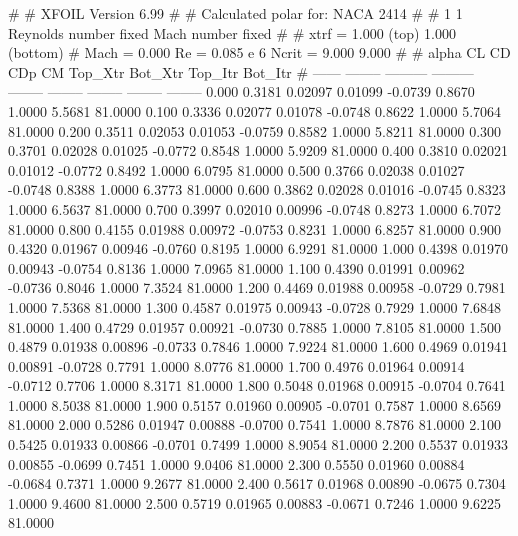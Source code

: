 #  
#       XFOIL         Version 6.99
#  
# Calculated polar for: NACA 2414                                       
#  
# 1 1 Reynolds number fixed          Mach number fixed         
#  
# xtrf =   1.000 (top)        1.000 (bottom)  
# Mach =   0.000     Re =     0.085 e 6     Ncrit =   9.000  9.000
#  
#   alpha    CL        CD       CDp       CM     Top_Xtr  Bot_Xtr  Top_Itr  Bot_Itr
#  ------ -------- --------- --------- -------- -------- -------- -------- --------
   0.000   0.3181   0.02097   0.01099  -0.0739   0.8670   1.0000   5.5681  81.0000
   0.100   0.3336   0.02077   0.01078  -0.0748   0.8622   1.0000   5.7064  81.0000
   0.200   0.3511   0.02053   0.01053  -0.0759   0.8582   1.0000   5.8211  81.0000
   0.300   0.3701   0.02028   0.01025  -0.0772   0.8548   1.0000   5.9209  81.0000
   0.400   0.3810   0.02021   0.01012  -0.0772   0.8492   1.0000   6.0795  81.0000
   0.500   0.3766   0.02038   0.01027  -0.0748   0.8388   1.0000   6.3773  81.0000
   0.600   0.3862   0.02028   0.01016  -0.0745   0.8323   1.0000   6.5637  81.0000
   0.700   0.3997   0.02010   0.00996  -0.0748   0.8273   1.0000   6.7072  81.0000
   0.800   0.4155   0.01988   0.00972  -0.0753   0.8231   1.0000   6.8257  81.0000
   0.900   0.4320   0.01967   0.00946  -0.0760   0.8195   1.0000   6.9291  81.0000
   1.000   0.4398   0.01970   0.00943  -0.0754   0.8136   1.0000   7.0965  81.0000
   1.100   0.4390   0.01991   0.00962  -0.0736   0.8046   1.0000   7.3524  81.0000
   1.200   0.4469   0.01988   0.00958  -0.0729   0.7981   1.0000   7.5368  81.0000
   1.300   0.4587   0.01975   0.00943  -0.0728   0.7929   1.0000   7.6848  81.0000
   1.400   0.4729   0.01957   0.00921  -0.0730   0.7885   1.0000   7.8105  81.0000
   1.500   0.4879   0.01938   0.00896  -0.0733   0.7846   1.0000   7.9224  81.0000
   1.600   0.4969   0.01941   0.00891  -0.0728   0.7791   1.0000   8.0776  81.0000
   1.700   0.4976   0.01964   0.00914  -0.0712   0.7706   1.0000   8.3171  81.0000
   1.800   0.5048   0.01968   0.00915  -0.0704   0.7641   1.0000   8.5038  81.0000
   1.900   0.5157   0.01960   0.00905  -0.0701   0.7587   1.0000   8.6569  81.0000
   2.000   0.5286   0.01947   0.00888  -0.0700   0.7541   1.0000   8.7876  81.0000
   2.100   0.5425   0.01933   0.00866  -0.0701   0.7499   1.0000   8.9054  81.0000
   2.200   0.5537   0.01933   0.00855  -0.0699   0.7451   1.0000   9.0406  81.0000
   2.300   0.5550   0.01960   0.00884  -0.0684   0.7371   1.0000   9.2677  81.0000
   2.400   0.5617   0.01968   0.00890  -0.0675   0.7304   1.0000   9.4600  81.0000
   2.500   0.5719   0.01965   0.00883  -0.0671   0.7246   1.0000   9.6225  81.0000
